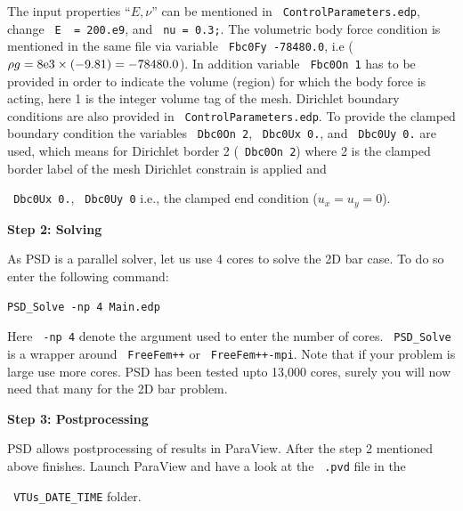 The input properties ``$E,\nu$'' can be mentioned in \lstinline[style=Linux]! ControlParameters.edp!, change \lstinline[style=Linux]! E  = 200.e9!, and \lstinline[style=Linux]! nu = 0.3;!. The volumetric body force condition is mentioned in the same file via variable \lstinline[style=Linux]! Fbc0Fy -78480.0!, i.e ($\rho g=8\text e3\times (-9.81)=-78480.0$). In addition variable \lstinline[style=Linux]! Fbc0On 1! has to be provided in order to indicate the volume (region) for which the body force is acting, here 1 is the integer volume tag of the mesh. Dirichlet boundary conditions are also provided in \lstinline[style=Linux]! ControlParameters.edp!. To provide the clamped boundary condition the variables   \lstinline[style=Linux]! Dbc0On 2!, \lstinline[style=Linux]! Dbc0Ux 0.!, and \lstinline[style=Linux]! Dbc0Uy 0.!  are used, which means for Dirichlet border 2 (\lstinline[style=Linux]! Dbc0On 2!) where 2 is the clamped border label of the mesh  Dirichlet constrain is applied and {\lstinline[style=Linux]! Dbc0Ux 0.!, {\lstinline[style=Linux]! Dbc0Uy 0!} i.e., the clamped end condition ($u_x=u_y=0$).

\textbf{Step 2: Solving}

As PSD is a parallel solver, let us use  4 cores to solve the 2D bar case. To do so enter the following command:

\begin{lstlisting}[style=Linux]
PSD_Solve -np 4 Main.edp
\end{lstlisting}

Here \lstinline[style=Linux]! -np 4! denote the argument used to enter the number of cores. \lstinline[style=Linux]! PSD_Solve! is a wrapper around \lstinline[style=Linux]! FreeFem++! or \lstinline[style=Linux]! FreeFem++-mpi!.  Note that if your problem is large use more cores. PSD has been tested upto 13,000 cores, surely you will now need that many for the 2D bar problem. 

\textbf{Step 3: Postprocessing}

PSD allows postprocessing of results in ParaView. After the step 2 mentioned above finishes. Launch ParaView and have a look at the  \lstinline[style=Linux]! .pvd! file in the  {\lstinline[style=Linux]! VTUs_DATE_TIME! folder. 

}}
